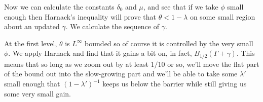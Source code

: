 \documentclass[11pt]{amsart}
\theoremstyle{remark}
\newcommand{\n}{^{-1}}
\begin{document}
Now we can calculate the constants $\delta_0$ and $\mu$, and see that if we take $\phi$ small enough then Harnack's inequality will prove that $\theta < 1-\lambda$ on some small region about an updated $\gamma$.  We calculate the sequence of $\gamma$.  

At the first level, $\theta$ is $L^\infty$ bounded so of course it is controlled by the very small $\phi$.  We apply Harnack and find that it gains a bit on, in fact, $B_{1/2}(\Gamma+\gamma)$.  This means that so long as we zoom out by at least $1/10$ or so, we'll move the flat part of the bound out into the slow-growing part and we'll be able to take some $\lambda'$ small enough that $(1-\lambda')\n$ keeps us below the barrier while still giving us some very small gain.  
\end{document}
